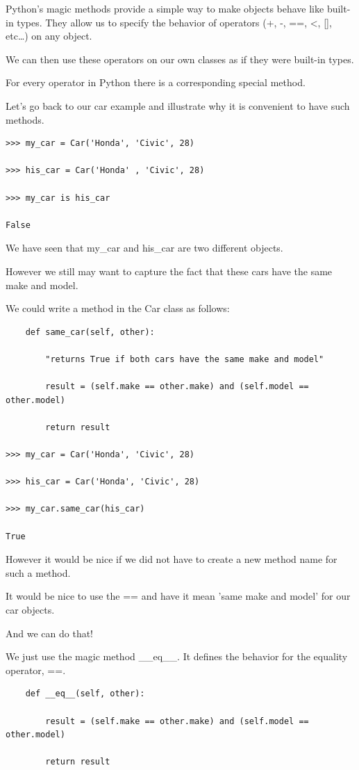 \documentclass{article}
\begin{document}
Python's magic methods provide a simple way to make objects behave like built-in types.  They allow us to specify the behavior of operators (+, -, ==, <, [], etc…) on any object.

We can  then use these operators on our own classes as if they were built-in types.  

For every operator in Python there is a corresponding special method.  

Let's go back to our car example and illustrate why it is convenient to have such methods.

\begin{lstlisting}
>>> my_car = Car('Honda', 'Civic', 28)

>>> his_car = Car('Honda' , 'Civic', 28)

>>> my_car is his_car 

False  
\end{lstlisting}

We have seen that my{\_}car and his{\_}car are two different objects.

However we still may want to capture the fact that these cars have the same make and model.

We could write a method in the Car class as follows:
\begin{lstlisting}
    def same_car(self, other):

        "returns True if both cars have the same make and model"

        result = (self.make == other.make) and (self.model == other.model)

        return result

>>> my_car = Car('Honda', 'Civic', 28)

>>> his_car = Car('Honda', 'Civic', 28)

>>> my_car.same_car(his_car)

True
\end{lstlisting}

However it would be nice if we did not have to create a new method name for such a method.  

It would be nice to use the == and have it mean 'same make and model' for our car objects.

And we can do that!

We just use the magic method {\_}{\_}eq{\_}{\_}.  It defines the  behavior for the equality operator, ==.

\begin{lstlisting}
    def __eq__(self, other):

        result = (self.make == other.make) and (self.model == other.model)

        return result
\end{lstlisting}
\end{document}
